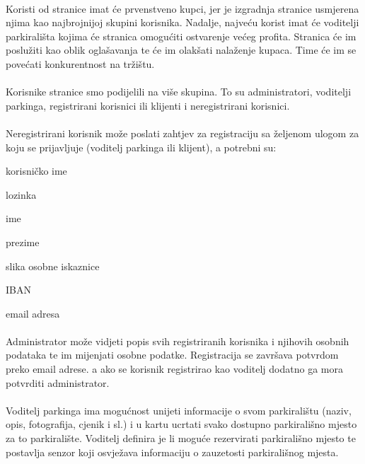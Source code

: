 \paragraph*{}{Koristi od stranice imat će prvenstveno kupci, jer je izgradnja stranice usmjerena njima kao najbrojnijoj skupini korisnika. Nadalje, najveću korist imat će voditelji parkirališta kojima će stranica omogućiti ostvarenje većeg profita. Stranica će im poslužiti kao oblik oglašavanja te će im olakšati nalaženje kupaca. Time će im se povećati konkurentnost na tržištu.}
\paragraph*{}{
Korisnike stranice smo podijelili na više skupina. To su administratori, voditelji parkinga, registrirani korisnici ili klijenti i neregistrirani korisnici.}
\paragraph*{}{Neregistrirani korisnik može poslati zahtjev za registraciju sa željenom ulogom za koju se prijavljuje (voditelj parkinga ili klijent), a potrebni su: }
\begin{packed_item}
	\item {korisničko ime}
	\item {lozinka}
	\item {ime}
	\item {prezime}
	\item {slika osobne iskaznice}
	\item {IBAN}
	\item {email adresa}
\end{packed_item}
\paragraph*{}Administrator može vidjeti popis svih registriranih korisnika i njihovih osobnih podataka te im mijenjati osobne podatke. Registracija se završava potvrdom preko email adrese. a ako se korisnik registrirao kao voditelj dodatno ga mora potvrditi administrator.
\paragraph*{}{Voditelj parkinga ima mogućnost unijeti informacije o svom parkiralištu (naziv, opis, fotografija, cjenik i sl.) i u kartu ucrtati svako dostupno parkirališno mjesto za to parkiralište. Voditelj definira je li moguće rezervirati parkirališno mjesto te postavlja senzor koji osvježava informaciju o zauzetosti parkirališnog mjesta.}
